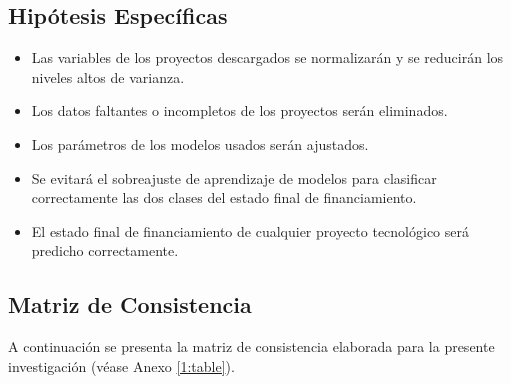 \subsection{Hipótesis Específicas}
\newcommand{\Hone}{
Las variables de los proyectos descargados se normalizarán y se reducirán los niveles altos de varianza.
}
\newcommand{\Htwo}{
Los datos faltantes o incompletos de los proyectos serán eliminados.
}
\newcommand{\Hthree}{
Los parámetros de los modelos usados serán ajustados.
}
\newcommand{\Hfour}{
Se evitará el sobreajuste de aprendizaje de modelos para clasificar correctamente las dos clases del estado final de financiamiento.
}
\newcommand{\Hfive}{
El estado final de financiamiento de cualquier proyecto tecnológico será predicho correctamente.
}
\begin{itemize}
	\item \Hone
	\item \Htwo
	\item \Hthree
	\item \Hfour
	\item \Hfive
\end{itemize}

\subsection{Matriz de Consistencia}
A continuación se presenta la matriz de consistencia elaborada para la presente investigación (véase Anexo \ref{1:table}).

